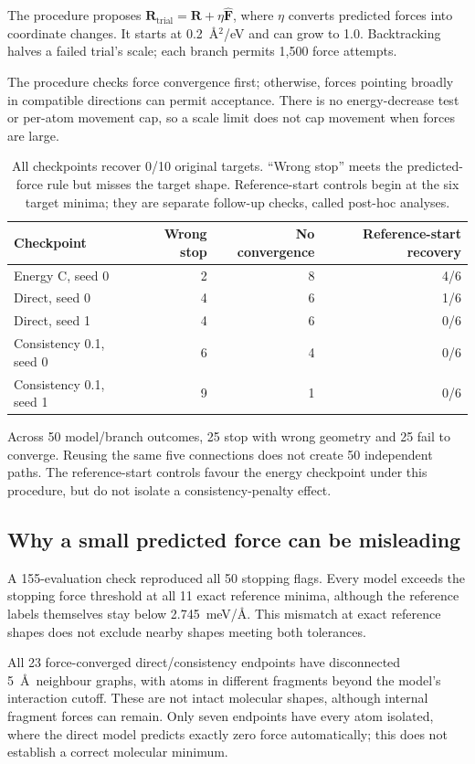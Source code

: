 \documentclass{article}
\begin{document}
The procedure proposes $\mathbf R_{\mathrm{trial}}=\mathbf R+\eta\widehat{\mathbf F}$, where $\eta$ converts predicted forces into coordinate changes. It starts at 0.2~\AA$^2$/eV and can grow to 1.0. Backtracking halves a failed trial's scale; each branch permits 1,500 force attempts.

The procedure checks force convergence first; otherwise, forces pointing broadly in compatible directions can permit acceptance. There is no energy-decrease test or per-atom movement cap, so a scale limit does not cap movement when forces are large.
\begin{table}[H]
\centering\small
\caption{All checkpoints recover 0/10 original targets. ``Wrong stop'' meets the predicted-force rule but misses the target shape. Reference-start controls begin at the six target minima; they are separate follow-up checks, called post-hoc analyses.}\label{tab:recovery}
\begin{tabular}{lrrr}\toprule
Checkpoint & Wrong stop & No convergence & Reference-start recovery\\\midrule
Energy C, seed 0 & 2 & 8 & 4/6\\
Direct, seed 0 & 4 & 6 & 1/6\\
Direct, seed 1 & 4 & 6 & 0/6\\
Consistency 0.1, seed 0 & 6 & 4 & 0/6\\
Consistency 0.1, seed 1 & 9 & 1 & 0/6\\\bottomrule
\end{tabular}
\end{table}
Across 50 model/branch outcomes, 25 stop with wrong geometry and 25 fail to converge. Reusing the same five connections does not create 50 independent paths. The reference-start controls favour the energy checkpoint under this procedure, but do not isolate a consistency-penalty effect.
\subsection{Why a small predicted force can be misleading}
A 155-evaluation check reproduced all 50 stopping flags. Every model exceeds the stopping force threshold at all 11 exact reference minima, although the reference labels themselves stay below 2.745~meV/\AA. This mismatch at exact reference shapes does not exclude nearby shapes meeting both tolerances.

All 23 force-converged direct/consistency endpoints have disconnected 5~\AA\ neighbour graphs, with atoms in different fragments beyond the model's interaction cutoff. These are not intact molecular shapes, although internal fragment forces can remain. Only seven endpoints have every atom isolated, where the direct model predicts exactly zero force automatically; this does not establish a correct molecular minimum.
\end{document}
